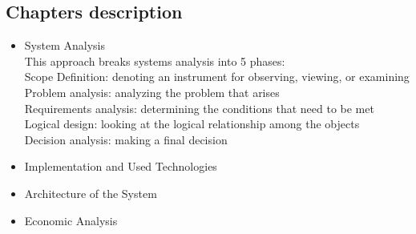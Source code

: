 \subsection{Chapters description}
	\begin{itemize}
	\item System Analysis
	\\
	This approach breaks systems analysis into 5 \cite{sa} phases:\\
	Scope Definition: denoting an instrument for observing, viewing, or examining\\
	Problem analysis: analyzing the problem that arises\\
	Requirements analysis: determining the conditions that need to be met\\
	Logical design: looking at the logical relationship among the objects\\
	Decision analysis: making a final decision
	
	\item {Implementation and Used Technologies}
	\item {Architecture of the System}
	\item {Economic Analysis}
	\end{itemize}
\clearpage